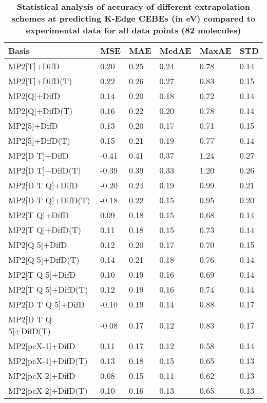 \begin{table}
  \caption{\textbf{Statistical analysis of accuracy of different extrapolation schemes at predicting K-Edge CEBEs (in eV) compared to experimental data for all data points (82 molecules)}}
  \begin{tabular}{l l l l l l }
    \toprule
    \textbf{Basis} & \textbf{MSE} & \textbf{MAE} & \textbf{MedAE} & \textbf{MaxAE} & \textbf{STD} \\ 
    \midrule
    MP2[T]+DifD & 0.20 & 0.25 & 0.24 & 0.78 & 0.14 \\ 
    MP2[T]+DifD(T) & 0.22 & 0.26 & 0.27 & 0.83 & 0.15 \\ 
    MP2[Q]+DifD & 0.14 & 0.20 & 0.18 & 0.72 & 0.14 \\ 
    MP2[Q]+DifD(T) & 0.16 & 0.22 & 0.20 & 0.78 & 0.14 \\ 
    MP2[5]+DifD & 0.13 & 0.20 & 0.17 & 0.71 & 0.15 \\ 
    MP2[5]+DifD(T) & 0.15 & 0.21 & 0.19 & 0.77 & 0.14 \\ 
    MP2[D T]+DifD & -0.41 & 0.41 & 0.37 & 1.24 & 0.27 \\ 
    MP2[D T]+DifD(T) & -0.39 & 0.39 & 0.33 & 1.20 & 0.26 \\ 
    MP2[D T Q]+DifD & -0.20 & 0.24 & 0.19 & 0.99 & 0.21 \\ 
    MP2[D T Q]+DifD(T) & -0.18 & 0.22 & 0.15 & 0.95 & 0.20 \\ 
    MP2[T Q]+DifD & 0.09 & 0.18 & 0.15 & 0.68 & 0.14 \\ 
    MP2[T Q]+DifD(T) & 0.11 & 0.18 & 0.15 & 0.73 & 0.14 \\ 
    MP2[Q 5]+DifD & 0.12 & 0.20 & 0.17 & 0.70 & 0.15 \\ 
    MP2[Q 5]+DifD(T) & 0.14 & 0.21 & 0.18 & 0.76 & 0.14 \\ 
    MP2[T Q 5]+DifD & 0.10 & 0.19 & 0.16 & 0.69 & 0.14 \\ 
    MP2[T Q 5]+DifD(T) & 0.12 & 0.19 & 0.16 & 0.74 & 0.14 \\ 
    MP2[D T Q 5]+DifD & -0.10 & 0.19 & 0.14 & 0.88 & 0.17 \\ 
    MP2[D T Q 5]+DifD(T) & -0.08 & 0.17 & 0.12 & 0.83 & 0.17 \\ 
    MP2[pcX-1]+DifD & 0.11 & 0.17 & 0.12 & 0.58 & 0.14 \\ 
    MP2[pcX-1]+DifD(T) & 0.13 & 0.18 & 0.15 & 0.65 & 0.13 \\ 
    MP2[pcX-2]+DifD & 0.08 & 0.15 & 0.11 & 0.62 & 0.13 \\ 
    MP2[pcX-2]+DifD(T) & 0.10 & 0.16 & 0.13 & 0.65 & 0.13 \\ 

\end{tabular}
\end{table}
